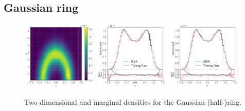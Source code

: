 \subsection{Gaussian ring}
\label{sec:toy_ring}

\begin{figure}[b!]
\centering
\includegraphics[width=0.32\textwidth, page=1]{./figures/bINN/gauss_ring_2dhists}
\includegraphics[width=0.32\textwidth, page=1]{./figures/bINN/gauss_ring_1dhists}
\includegraphics[width=0.32\textwidth, page=2]{./figures/bINN/gauss_ring_1dhists}
\caption{Two-dimensional and marginal densities for the Gaussian
  (half-)ring.}
\label{fig:gauss_hists}
\end{figure}

